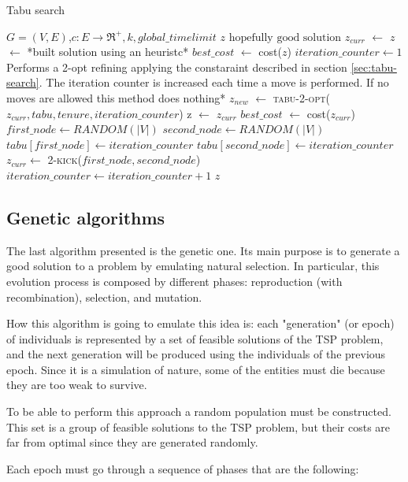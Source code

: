 \begin{algorithm}
	\caption{Tabu search}\label{algo:tabu-search}
	\begin{algorithmic}[1]
		\Require $G=(V,E)$,$ c:E\rightarrow \Re^+, k, global\_timelimit$
		\Ensure $z\text{ hopefully good solution}$
		\State $z_{curr}$ $\gets$ $z$ $\gets$ *built solution using an heuristc*
		\State $best\_cost$ $\gets$ cost($z$)
		\State $iteration\_counter \gets 1$
			\State *Performs a 2-opt refining applying the constaraint described in section \ref{sec:tabu-search}. The iteration counter is increased each time a move is performed. If no moves are allowed this method does nothing*
			\State $z_{new}$ $\gets$ \textsc{tabu-2-opt($z_{curr}, tabu, tenure, iteration\_counter$)}
				\State z $\gets$ $z_{curr}$
				\State $best\_cost$ $\gets$ cost($z_{curr}$)
			\EndIf
			\State $first\_node \gets RANDOM(|V|)$
			\State $second\_node \gets RANDOM(|V|)$
			\State $tabu[first\_node] \gets iteration\_counter$
			\State $tabu[second\_node] \gets iteration\_counter$
			\State $z_{curr} \gets $ \textsc{2-kick($first\_node, second\_node$)}
			\State $iteration\_counter \gets iteration\_counter+1$
		\EndWhile
		\State \Return $z$
	\end{algorithmic}
\end{algorithm}

\subsection{Genetic algorithms}
The last algorithm presented is the genetic one. Its main purpose is to generate a good solution to a problem by emulating natural selection. In particular, this evolution process is composed by different phases: reproduction (with recombination), selection, and mutation.

How this algorithm is going to emulate this idea is: each "generation" (or epoch) of individuals is represented by a set of feasible solutions of the TSP problem, and the next generation will be produced using the individuals of the previous epoch. Since it is a simulation of nature, some of the entities must die because they are too weak to survive.

To be able to perform this approach a random population must be constructed. This set is a group of feasible solutions to the TSP problem, but their costs are far from optimal since they are generated randomly.

Each epoch must go through a sequence of phases that are the following:

